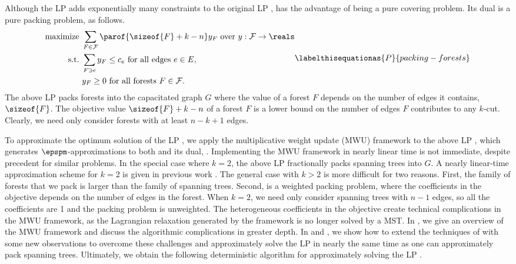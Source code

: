 \documentclass[11pt]{article}
\numberwithin{equation}{section}
\theoremstyle{definition}
\theoremstyle{plain}
\newcommand{\costof}[1]{c_{#1}}
\newcommand{\capacityof}{\costof}%
\newcommand{\forests}{\mathcal{F}} %
\begin{document}
Although the LP  adds exponentially many constraints
to the original LP ,  has the
advantage of being a pure covering problem. Its dual is a pure packing
problem, as follows.
\begin{align}
  \begin{aligned}
    \text{maximize } & \sum_{F \in \forests} \parof{\sizeof{F} + k -
      n} y_F %
    \text{ over } y: \forests \to \reals %
    \\
    \text{ s.t.\ } & \sum_{F \ni e} y_F \leq \capacityof{e} \text{ for
      all
      edges } e \in E,\\
    & y_F \geq 0 \text{ for all forests } F \in \forests.
  \end{aligned}
      \labelthisequationas{P}{packing-forests}
\end{align}
The above LP packs forests into the capacitated graph $G$ where the
value of a forest $F$ depends on the number of edges it contains,
$\sizeof{F}$. The objective value $\sizeof{F} + k - n$ of a forest $F$
is a lower bound on the number of edges $F$ contributes to any
$k$-cut.  Clearly, we need only consider forests with at least
$n - k + 1$ edges.

To approximate %
%
%
%
%
%
the optimum solution of the  %
%
LP , we apply the
multiplicative weight update (MWU)
framework to the above LP
, which generates
%
$\epspm$-approximations  %
to both  and its dual,
.  Implementing the MWU framework in nearly linear
time is not immediate, despite precedent for similar problems.  In the
special case where $k = 2$, the above LP 
fractionally packs spanning trees into $G$.  A nearly
%
linear-time  %
approximation scheme for $k = 2$ is given in previous work
\cite{cq-17-soda}. The general case with $k > 2$ is more difficult for
two reasons. First, the family of forests that we pack is larger than
the family of spanning trees. Second,  is
a weighted packing problem, where the coefficients in the objective
depends on the number of edges in the forest. When $k = 2$, we need
only consider spanning trees with $n - 1$ edges, so all the
coefficients are 1 and the packing problem is unweighted.  The
heterogeneous coefficients in the objective create technical
complications in the MWU framework, as the Lagrangian relaxation
generated by the framework is no longer solved by a MST. In
, we give an overview of the MWU framework and discuss
the algorithmic complications in greater depth.  In
 and , we show
how to extend the techniques of \cite{cq-17-soda} with some new
observations to overcome these challenges and %
%
approximately solve %
%
the LP
 in nearly the same time as one can
approximately pack spanning trees. Ultimately, we obtain the following
deterministic algorithm for
%
approximately solving %
the LP .
\end{document}
